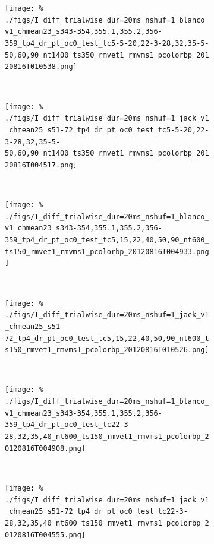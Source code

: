 \begin{figure}[htbp]
    \begin{subfigure}[b]{0.5\linewidth}
        \centering
        \caption{\small{}}
        \label{fig:b1-alldif}
        \texttt{[image: \%
./figs/I\_diff\_trialwise\_dur=20ms\_nshuf=1\_blanco\_v1\_chmean23\_s343-354,355.1,355.2,356-359\_tp4\_dr\_pt\_oc0\_test\_tc5-5-20,22-3-28,32,35-5-50,60,90\_nt1400\_ts350\_rmvet1\_rmvms1\_pcolorbp\_20120816T010538.png]}
    \end{subfigure}
    ~~
    \begin{subfigure}[b]{0.5\linewidth}
        \centering
        \caption{\small{}}
        \label{fig:j1-alldif}
        \texttt{[image: \%
./figs/I\_diff\_trialwise\_dur=20ms\_nshuf=1\_jack\_v1\_chmean25\_s51-72\_tp4\_dr\_pt\_oc0\_test\_tc5-5-20,22-3-28,32,35-5-50,60,90\_nt1400\_ts350\_rmvet1\_rmvms1\_pcolorbp\_20120816T004517.png]}
    \end{subfigure}
    \\
    \begin{subfigure}[b]{0.5\linewidth}
        \centering
        \caption{\small{}}
        \label{fig:b1-cdif}
        \texttt{[image: \%
./figs/I\_diff\_trialwise\_dur=20ms\_nshuf=1\_blanco\_v1\_chmean23\_s343-354,355.1,355.2,356-359\_tp4\_dr\_pt\_oc0\_test\_tc5,15,22,40,50,90\_nt600\_ts150\_rmvet1\_rmvms1\_pcolorbp\_20120816T004933.png]}
    \end{subfigure}
    ~~
    \begin{subfigure}[b]{0.5\linewidth}
        \centering
        \caption{\small{}}
        \label{fig:j1-cdif}
        \texttt{[image: \%
./figs/I\_diff\_trialwise\_dur=20ms\_nshuf=1\_jack\_v1\_chmean25\_s51-72\_tp4\_dr\_pt\_oc0\_test\_tc5,15,22,40,50,90\_nt600\_ts150\_rmvet1\_rmvms1\_pcolorbp\_20120816T010526.png]}
    \end{subfigure}
    \\
    \begin{subfigure}[b]{0.5\linewidth}
        \centering
        \caption{\small{}}
        \label{fig:b1-fdif}
        \texttt{[image: \%
./figs/I\_diff\_trialwise\_dur=20ms\_nshuf=1\_blanco\_v1\_chmean23\_s343-354,355.1,355.2,356-359\_tp4\_dr\_pt\_oc0\_test\_tc22-3-28,32,35,40\_nt600\_ts150\_rmvet1\_rmvms1\_pcolorbp\_20120816T004908.png]}
    \end{subfigure}
    ~~
    \begin{subfigure}[b]{0.5\linewidth}
        \centering
        \caption{\small{}}
        \label{fig:j1-fdif}
        \texttt{[image: \%
./figs/I\_diff\_trialwise\_dur=20ms\_nshuf=1\_jack\_v1\_chmean25\_s51-72\_tp4\_dr\_pt\_oc0\_test\_tc22-3-28,32,35,40\_nt600\_ts150\_rmvet1\_rmvms1\_pcolorbp\_20120816T004555.png]}

\end{subfigure}
\end{figure}
